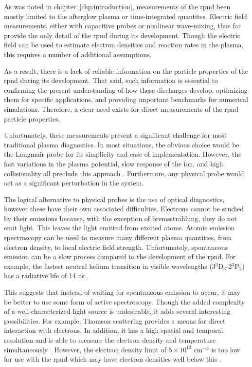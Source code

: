 As was noted in chapter~\ref{chp:introduction}, measurements of the \acs{rpnd}
been mostly limited to the afterglow plasma or time-integrated quantites.
Electric field measurements, either with capacitive probes or nonlinear
wave-mixing, thus far provide the only detail of the \acs{rpnd} during its
development. Though the electric field can be used to estimate electron
densities and reaction rates in the plasma, this requires a number of additional
assumptions.

As a result, there is a lack of reliable information on the particle properties
of the \acs{rpnd} during its development. That said, such information is
essential to confirming the present understanding of how these discharges
develop, optimizing them for specific applications, and providing important
benchmarks for numerical simulations. Therefore, a clear need exists for direct
measurements of the \acs{rpnd} particle properties.

Unfortunately, these measurements present a significant challenge for most
traditional plasma diagnostics. In most situations, the obvious choice would be
the Langmuir probe for its simplicity and ease of implementation. However, the
fast variations in the plasma potential, slow response of the ion, and high
collisionality all preclude this approach \cite{Lieberman2005}. Furthermore, any
physical probe would act as a significant perturbation in the system.

The logical alternative to physical probes is the use of optical diagnostics,
however these have their own associated difficulties. Electrons cannot be
studied by their emissions because, with the exception of bremsstrahlung, they
do not emit light. This leaves the light emitted from excited atoms. Atomic
emission spectroscopy can be used to measure many different plasma quantities,
from electron density, to local electric field strength. Unfortunately,
spontaneous emission can be a slow process compared to the development of the
\acs{rpnd}. For example, the fastest neutral helium transition in visible
wavelengths (3$^3$D$_3$-2$^3$P$_2^\cdot$) has a radiative life of 14 ns
\cite{Ralchenko2011}.

This suggests that instead of waiting for spontaneous emission to occur, it may
be better to use some form of active spectroscopy. Though the added complexity
of a well-characterized light source is undesirable, it adds several interesting
possibilities. For example, Thomson scattering provides a means for direct
interaction with electrons. In addition, it has a high spatial and temporal
resolution and is able to measure the electron density and temperature
simultaneously \cite{VanGessel2012}. However, the electron density limit of
$5\times10^{12}$ cm$^{-3}$ is too low for use with the \acs{rpnd} which may have
electron densities well below this \cite{Pai2009}.

